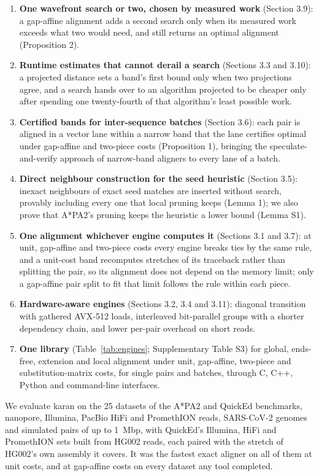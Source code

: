 \begin{enumerate}
  \item \textbf{One wavefront search or two, chosen by measured work} (Section 3.9): a gap-affine alignment adds a second search only when its measured work exceeds what two would need, and still returns an optimal alignment (Proposition 2).
  \item \textbf{Runtime estimates that cannot derail a search} (Sections 3.3 and 3.10): a projected distance sets a band's first bound only when two projections agree, and a search hands over to an algorithm projected to be cheaper only after spending one twenty-fourth of that algorithm's least possible work.
  \item \textbf{Certified bands for inter-sequence batches} (Section 3.6): each pair is aligned in a vector lane within a narrow band that the lane certifies optimal under gap-affine and two-piece costs (Proposition 1), bringing the speculate-and-verify approach of narrow-band aligners \citep{Gibrat2018band,Fujiki2020seedex} to every lane of a batch.
  \item \textbf{Direct neighbour construction for the seed heuristic} (Section 3.5): inexact neighbours of exact seed matches are inserted without search, provably including every one that local pruning keeps (Lemma 1); we also prove that A*PA2's pruning keeps the heuristic a lower bound (Lemma S1).
  \item \textbf{One alignment whichever engine computes it} (Sections 3.1 and 3.7): at unit, gap-affine and two-piece costs every engine breaks ties by the same rule, and a unit-cost band recomputes stretches of its traceback rather than splitting the pair, so its alignment does not depend on the memory limit; only a gap-affine pair split to fit that limit follows the rule within each piece.
  \item \textbf{Hardware-aware engines} (Sections 3.2, 3.4 and 3.11): diagonal transition with gathered AVX-512 loads, interleaved bit-parallel groups with a shorter dependency chain, and lower per-pair overhead on short reads.
  \item \textbf{One library} (Table~\ref{tab:engines}; Supplementary Table S3) for global, ends-free, extension and local alignment under unit, gap-affine, two-piece and substitution-matrix costs, for single pairs and batches, through C, C++, Python and command-line interfaces.
\end{enumerate}

We evaluate karan on the 25 datasets of the A*PA2 and QuickEd benchmarks, nanopore, Illumina, PacBio HiFi and PromethION reads, SARS-CoV-2 genomes and simulated pairs of up to 1~Mbp, with QuickEd's Illumina, HiFi and PromethION sets built from HG002 reads, each paired with the stretch of HG002's own assembly it covers. It was the fastest exact aligner on all of them at unit costs, and at gap-affine costs on every dataset any tool completed.
